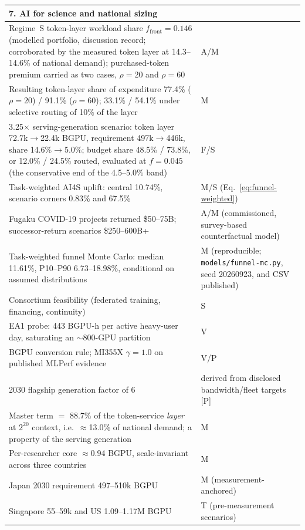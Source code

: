 \begin{small}
\begin{longtable}{p{100mm}p{36mm}}
  \midrule
  \multicolumn{2}{l}{\textbf{7. AI for science and national sizing}} \\
  \midrule
  Regime~S token-layer workload share $f_{\mathrm{front}}=0.146$ (modelled portfolio, discussion record; corroborated by the measured token layer at 14.3--14.6\% of national demand); purchased-token premium carried as two cases, $\rho=20$ and $\rho=60$ & A/M \\
  Resulting token-layer share of expenditure 77.4\% ($\rho=20$) / 91.1\% ($\rho=60$); 33.1\% / 54.1\% under selective routing of 10\% of the layer & M \\
  3.25$\times$ serving-generation scenario: token layer 72.7k$\rightarrow$22.4k BGPU, requirement 497k$\rightarrow$446k, share 14.6\%$\rightarrow$5.0\%; budget share 48.5\% / 73.8\%, or 12.0\% / 24.5\% routed, evaluated at $f = 0.045$ (the conservative end of the 4.5--5.0\% band) & F/S \\
  Task-weighted AI4S uplift: central 10.74\%, scenario corners 0.83\% and 67.5\% & M/S (Eq.~\ref{eq:funnel-weighted}) \\
  Fugaku COVID-19 projects returned \$50--75B; successor-return scenarios \$250--600B+ & A/M (commissioned, survey-based counterfactual model) \\
  Task-weighted funnel Monte Carlo: median 11.61\%, P10--P90 6.73--18.98\%, conditional on assumed distributions & M (reproducible; \texttt{models/funnel-mc.py}, seed 20260923, and CSV published) \\
  Consortium feasibility (federated training, financing, continuity) & S \\
  EA1 probe: 443 BGPU-h per active heavy-user day, saturating an $\sim$800-GPU partition & V \\
  BGPU conversion rule; MI355X $\gamma=1.0$ on published MLPerf evidence & V/P \\
  2030 flagship generation factor of 6 & derived from disclosed bandwidth/fleet targets [P] \\
  Master term $=$ 88.7\% of the token-service \emph{layer} at $2^{20}$ context, i.e.\ $\approx$13.0\% of national demand; a property of the serving generation & M \\
  Per-researcher core $\approx$0.94 BGPU, scale-invariant across three countries & M \\
  Japan 2030 requirement 497--510k BGPU & M (measurement-anchored) \\
  Singapore 55--59k and US 1.09--1.17M BGPU & T (pre-measurement scenarios) \\

\end{longtable}
\end{small}
